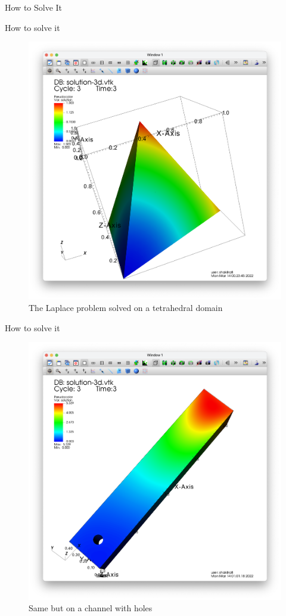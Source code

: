 \documentclass{beamer}
\begin{document}
\begin{section}{How to Solve It}
\begin{frame}{How to solve it}
    \begin{figure}
    \includegraphics[scale=0.2]{Laplace3S.png}
    \caption{The Laplace problem solved on a tetrahedral domain}
    \end{figure}
\end{frame}
\begin{frame}{How to solve it}
    \begin{figure}
    \includegraphics[scale=0.2]{CWH.png}
    \caption{Same but on a channel with holes}
    \end{figure}
\end{frame}


\end{section}
\end{document}
